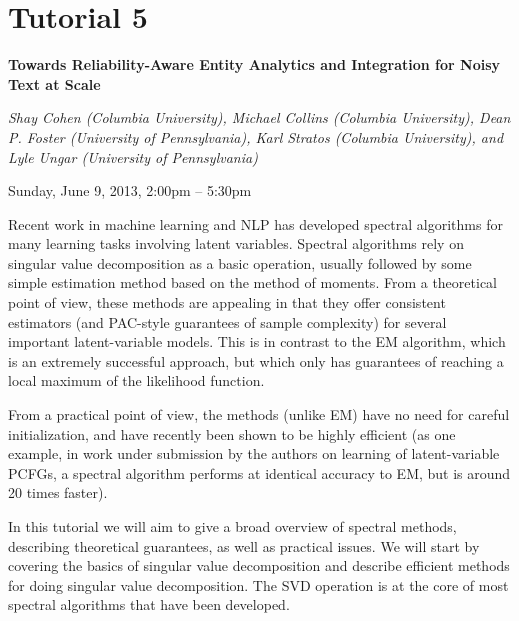 \section%
    [\textbf{T5:}  Spectral Learning Algorithms for Natural Language Processing (S. Cohen, M. Collins, D.~P. Foster, K. Stratos and L. Ungar)]
    {Tutorial 5}
\label{TutE}
\begin{center}
\begin{Large}
\bfseries Towards Reliability-Aware Entity Analytics and Integration for Noisy Text at Scale\\ \vspace{2em}\par
\end{Large}

{\itshape Shay Cohen (Columbia University), Michael Collins (Columbia University), Dean P. Foster (University of Pennsylvania), Karl Stratos (Columbia University), and Lyle Ungar (University of Pennsylvania)}\vspace{1em}\par
Sunday, June 9, 2013, 2:00pm -- 5:30pm \vspace{1em}\\
\TutLocE
\end{center}

\noindent
Recent work in machine learning and NLP has developed spectral algorithms for many learning tasks involving latent variables. Spectral algorithms rely on singular value decomposition as a basic operation, usually followed by some simple estimation method based on the method of moments. From a theoretical point of view, these methods are appealing in that they offer consistent estimators (and PAC-style guarantees of sample complexity) for several important latent-variable models. This is in contrast to the EM algorithm, which is an extremely successful approach, but which only has guarantees of reaching a local maximum of the likelihood function.

From a practical point of view, the methods (unlike EM) have no need for careful initialization, and have recently been shown to be highly efficient (as one example, in work under submission by the authors on learning of latent-variable PCFGs, a spectral algorithm performs at identical accuracy to EM, but is around 20 times faster).

In this tutorial we will aim to give a broad overview of spectral methods, describing theoretical guarantees, as well as practical issues. We will start by covering the basics of singular value decomposition and describe efficient methods for doing singular value decomposition. The SVD operation is at the core of most spectral algorithms that have been developed.

